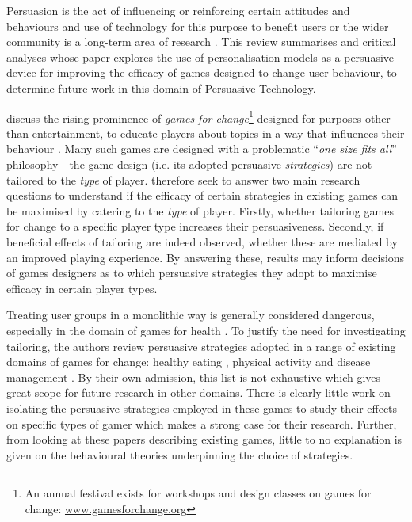 \documentclass[11pt]{article}
\begin{document}

Persuasion is the act of influencing or reinforcing certain attitudes and behaviours \citep{khaled2008} and use of technology for this purpose to benefit users or the wider community is a long-term area of research \citep{fogg2002}. This review summarises and critical analyses \citet{orji2017} whose paper explores the use of personalisation models as a persuasive device for improving the efficacy of games designed to change user behaviour, to determine future work in this domain of Persuasive Technology.

\citet{orji2017} discuss the rising prominence of \textit{games for change}\footnote{An annual festival exists for workshops and design classes on games for change: \url{www.gamesforchange.org}} designed for purposes other than entertainment, to educate players about topics in a way that influences their behaviour \citep{busch2015}. Many such games are designed with a problematic ``\textit{one size fits all}'' philosophy - the game design (i.e. its adopted persuasive \textit{strategies}) are not tailored to the \textit{type} of player. \citet{orji2017} therefore seek to answer two main research questions to understand if the efficacy of certain strategies in existing games \citep{peng2009,kaipainen2012} can be maximised by catering to the \textit{type} of player. Firstly, whether tailoring games for change to a specific player type increases their persuasiveness. Secondly, if beneficial effects of tailoring are indeed observed, whether these are mediated by an improved playing experience. By answering these, results may inform decisions of games designers as to which persuasive strategies they adopt to maximise efficacy in certain player types. 

Treating user groups in a monolithic way is generally considered dangerous, especially in the domain of games for health \citep{berkovsky2010}.  To justify the need for investigating tailoring, the authors review persuasive strategies adopted in a range of existing domains of games for change: healthy eating \citep{kaipainen2012, orji2013b}, physical activity \citep{fujiki2008} and disease management \citep{brownson2007}. By their own admission, this list is not exhaustive which gives great scope for future research in other domains. There is clearly little work on isolating the persuasive strategies employed in these games to study their effects on specific types of gamer which makes a strong case for their research. Further, from looking at these papers describing existing games, little to no explanation is given on the behavioural theories underpinning the choice of strategies. 
\end{document}
